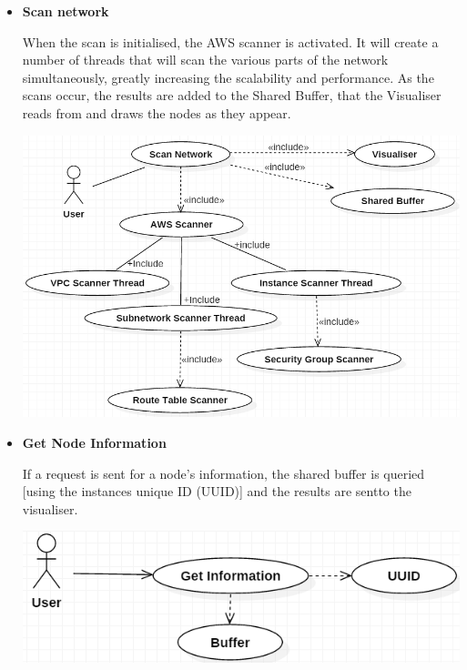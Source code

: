 \documentclass[a4paper,12pt]{report}
\begin{document}
\begin{itemize}
	\item \textbf{Scan network}
		\begin{flushleft}
		When the scan is initialised, the AWS scanner is activated. It will create a number of threads that will scan the various parts of the network simultaneously, greatly increasing the scalability and performance. As the scans occur, the results are added to the Shared Buffer, that the Visualiser reads from and draws the nodes as they appear.
		\end{flushleft}
		\begin{center}
  	 	\includegraphics[width=1\textwidth] {./Diagrams/ScanNetworkUseCase.png}\\[0.4cm]    
		\end{center}
\newpage
	\item \textbf{Get Node Information}
	\begin{flushleft}
	If a request is sent for a node's information, the shared buffer is queried [using the instances unique ID (UUID)] and the results are sentto the visualiser.
	\end{flushleft}
	\begin{center}
		\includegraphics[width=1\textwidth] {./Diagrams/GetNodeInformationUseCase.png}\\[0.4cm]    
	\end{center}



\end{itemize}
\end{document}
